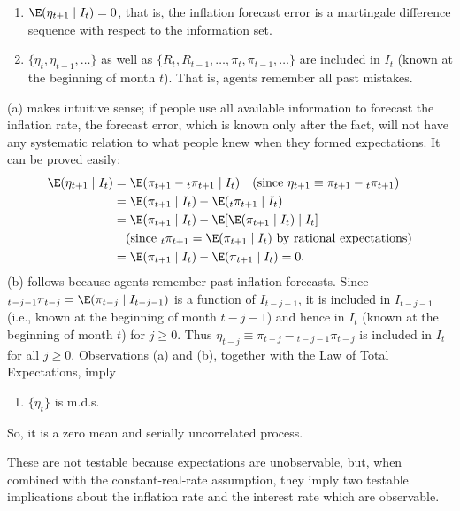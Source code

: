 \begin{enumerate}[label=(\alph*)]
\item $\E(\eta_{t+1} \mid I_t) = 0$, that is, the inflation forecast error is a martingale difference
sequence with respect to the information set.

\item $\{\eta_t, \eta_{t-1}, \ldots\}$ as well as
$\{R_t, R_{t-1}, \ldots, \pi_t, \pi_{t-1}, \ldots\}$ are included in $I_t$ (known
at the beginning of month $t$). That is, agents remember all past mistakes.
\end{enumerate}

(a) makes intuitive sense; if people use all available information to forecast the
inflation rate, the forecast error, which is known only after the fact, will not have
any systematic relation to what people knew when they formed expectations. It can
be proved easily:
%
\begin{align}
\E(\eta_{t+1} \mid I_t)
&= \E(\pi_{t+1} - {}_t\pi_{t+1} \mid I_t)
  \quad (\text{since } \eta_{t+1} \equiv \pi_{t+1} - {}_t\pi_{t+1}) \notag \\
&= \E(\pi_{t+1} \mid I_t) - \E({}_t\pi_{t+1} \mid I_t) \notag \\
&= \E(\pi_{t+1} \mid I_t) - \E[\E(\pi_{t+1} \mid I_t) \mid I_t] \notag \\
&\quad (\text{since } {}_t\pi_{t+1} = \E(\pi_{t+1} \mid I_t)
  \text{ by rational expectations}) \notag \\
&= \E(\pi_{t+1} \mid I_t) - \E(\pi_{t+1} \mid I_t) = 0.
\label{eq:2.11.1}
\end{align}
%
(b) follows because agents remember past inflation forecasts. Since
${}_t{}_{-j-1}\pi_{t-j} = \E(\pi_{t-j} \mid I_{t-j-1})$ is a function of $I_{t-j-1}$, it is included in
$I_{t-j-1}$ (i.e., known at the beginning of month $t - j - 1$) and hence in $I_t$ (known at the beginning of
month $t$) for $j \geq 0$. Thus
$\eta_{t-j} \equiv \pi_{t-j} - {}_{t-j-1}\pi_{t-j}$ is included in $I_t$ for all $j \geq 0$.
Observations (a) and (b), together with the Law of Total Expectations, imply

\begin{enumerate}[label=(\alph*),start=3]
\item $\{\eta_t\}$ is m.d.s.
\end{enumerate}

So, it is a zero mean and serially uncorrelated process.

These are not testable because expectations are unobservable, but, when combined with the constant-real-rate assumption, they imply two testable implications
about the inflation rate and the interest rate which are observable.

